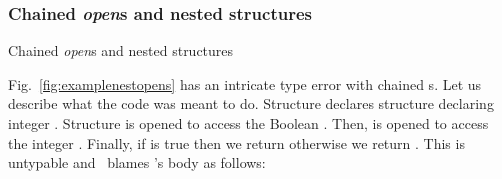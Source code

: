 


\subsubsection{Chained \emph{open}s and nested structures}
\label{sec:openerrorexample}



\begin{\myfigure}[t]
  \caption{Chained \emph{open}s and nested structures }
  \label{fig:examplenestopens}
\end{\myfigure}

Fig.~\ref{fig:examplenestopens} has an intricate type error
with chained s.
Let us describe what the code was meant to do.
Structure  declares structure 
declaring integer .
Structure  is opened to access the Boolean .
Then,  is opened to access the integer
.  Finally, if  is true
then we return  otherwise we return
.
This is untypable and \SMLNJ\ blames 's body
as follows:

